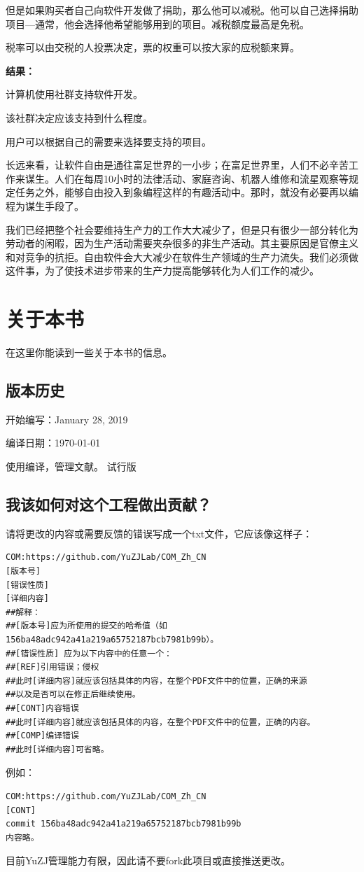但是如果购买者自己向软件开发做了捐助，那么他可以减税。他可以自己选择捐助项目—通常，他会选择他希望能够用到的项目。减税额度最高是免税。\par
税率可以由交税的人投票决定，票的权重可以按大家的应税额来算。\par
\bf 结果：\normalall\par
计算机使用社群支持软件开发。\par
该社群决定应该支持到什么程度。\par
用户可以根据自己的需要来选择要支持的项目。\par
长远来看，让软件自由是通往富足世界的一小步；在富足世界里，人们不必辛苦工作来谋生。人们在每周10小时的法律活动、家庭咨询、机器人维修和流星观察等规定任务之外，能够自由投入到象编程这样的有趣活动中。那时，就没有必要再以编程为谋生手段了。\par
我们已经把整个社会要维持生产力的工作大大减少了，但是只有很少一部分转化为劳动者的闲暇，因为生产活动需要夹杂很多的非生产活动。其主要原因是官僚主义和对竞争的抗拒。自由软件会大大减少在软件生产领域的生产力流失。我们必须做这件事，为了使技术进步带来的生产力提高能够转化为人们工作的减少。
\section{关于本书}
在这里你能读到一些关于本书的信息。
\subsection{版本历史}
开始编写：January 28, 2019\par
编译日期：\today \par
使用\XeLaTeX 编译，\BIBTEX 管理文献。
试行版
\subsection{我该如何对这个工程做出贡献？}
请将更改的内容或需要反馈的错误写成一个txt文件，它应该像这样子：
\begin{verbatim}
COM:https://github.com/YuZJLab/COM_Zh_CN
[版本号]
[错误性质]
[详细内容]
##解释：
##[版本号]应为所使用的提交的哈希值（如156ba48adc942a41a219a65752187bcb7981b99b）。
##[错误性质] 应为以下内容中的任意一个：
##[REF]引用错误；侵权
##此时[详细内容]就应该包括具体的内容，在整个PDF文件中的位置，正确的来源
##以及是否可以在修正后继续使用。
##[CONT]内容错误
##此时[详细内容]就应该包括具体的内容，在整个PDF文件中的位置，正确的内容。
##[COMP]编译错误
##此时[详细内容]可省略。
\end{verbatim} \par
例如：
\begin{verbatim}
COM:https://github.com/YuZJLab/COM_Zh_CN
[CONT]
commit 156ba48adc942a41a219a65752187bcb7981b99b
内容略。
\end{verbatim} \par
目前YuZJ管理能力有限，因此请不要fork此项目或直接推送更改。
